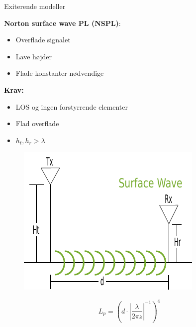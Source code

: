 \begin{frame}{Exiterende modeller}
\begin{minipage}{.45\textwidth}
\raggedright\textcolor{thomasgreen}{\textbf{Norton surface wave PL (NSPL)}:}
\begin{itemize}
\item Overflade signalet
\item Lave højder
\item Flade konstanter nødvendige
\end{itemize}

\vspace{1em}
\textcolor{black}{\textbf{Krav:}}
\begin{itemize}
\item LOS og ingen forstyrrende elementer
\item Flad overflade
\item $h_t,h_r > \lambda$
\end{itemize}

\end{minipage}%
\begin{minipage}{0.5\textwidth}
\begin{figure}[!htbp]
 \centering
  \includegraphics[width = \columnwidth]{figures/surf_illu.pdf}
  \end{figure}
\end{minipage}

\vspace{1em}
\begin{equation}
L_p=\left({d} \cdot \left|\frac{\lambda}{2\pi z}\right|^{-1}\right)^4
\label{surface_wave}
\end{equation}
\end{frame}





